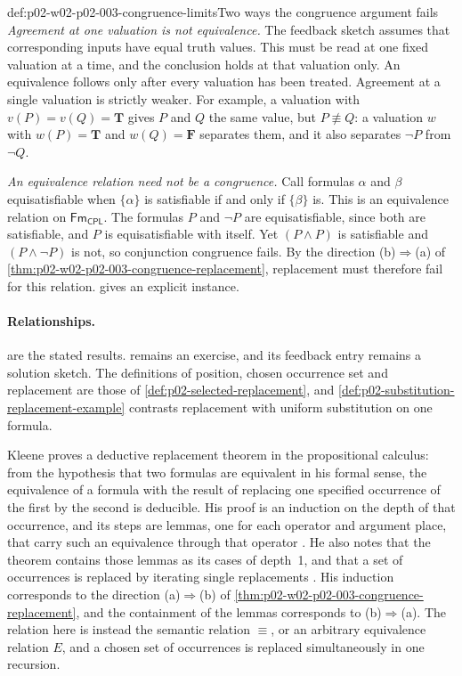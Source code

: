 \begin{hbwarning}{def:p02-w02-p02-003-congruence-limits}{Two ways the congruence argument fails}
\emph{Agreement at one valuation is not equivalence.}  The feedback sketch
assumes that corresponding inputs have equal truth values.  This must be
read at one fixed valuation at a time, and the conclusion holds at that
valuation only.  An equivalence follows only after every valuation has been
treated.  Agreement at a single valuation is strictly weaker.  For example, a
valuation with \(v(P)=v(Q)=\mathbf T\) gives \(P\) and \(Q\) the same value,
but \(P\not\equiv Q\): a valuation \(w\) with \(w(P)=\mathbf T\) and
\(w(Q)=\mathbf F\) separates them, and it also separates \(\neg P\) from
\(\neg Q\).

\emph{An equivalence relation need not be a congruence.}  Call formulas
\(\alpha\) and \(\beta\) equisatisfiable when \(\{\alpha\}\) is satisfiable
if and only if \(\{\beta\}\) is.  This is an equivalence relation on
\(\mathsf{Fm}_{\mathsf{CPL}}\).  The formulas \(P\) and \(\neg P\) are
equisatisfiable, since both are satisfiable, and \(P\) is equisatisfiable
with itself.  Yet \((P\land P)\) is satisfiable and \((P\land\neg P)\) is
not, so conjunction congruence fails.  By the direction (b)\(\Rightarrow\)(a)
of \cref{thm:p02-w02-p02-003-congruence-replacement}, replacement must
therefore fail for this relation.
 gives an explicit
instance.
\end{hbwarning}

\paragraph{Relationships.}
 are the stated
results.   remains an exercise, and its feedback
entry remains a solution sketch.  The definitions of position, chosen
occurrence set and replacement are those of
\cref{def:p02-selected-replacement}, and
\cref{def:p02-substitution-replacement-example} contrasts replacement with
uniform substitution on one formula.

Kleene proves a deductive replacement theorem in the propositional calculus:
from the hypothesis that two formulas are equivalent in his formal sense, the
equivalence of a formula with the result of replacing one specified
occurrence of the first by the second is deducible.  His proof is an
induction on the depth of that occurrence, and its steps are lemmas, one for
each operator and argument place, that carry such an equivalence through
that operator \cite[\S\,26, Theorem~6 and lemmas *26--*30, p.~116]{Kleene1952}.
He also notes that the theorem contains those lemmas as its cases of depth~1,
and that a set of occurrences is replaced by iterating single replacements
\cite[\S\,26, p.~117]{Kleene1952}.  His induction corresponds to the
direction (a)\(\Rightarrow\)(b) of
\cref{thm:p02-w02-p02-003-congruence-replacement}, and the containment of
the lemmas corresponds to (b)\(\Rightarrow\)(a).  The
relation here is instead the semantic relation \(\equiv\), or an arbitrary
equivalence relation \(E\), and a chosen set of occurrences is replaced
simultaneously in one recursion.
